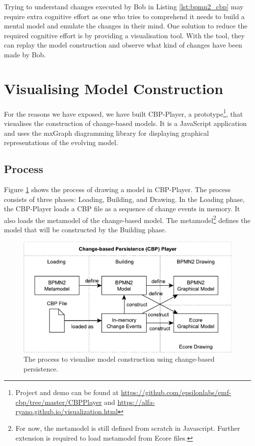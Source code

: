 \documentclass[conference]{IEEEtran}
\begin{document}
Trying to understand changes executed by Bob in Listing \ref{lst:bpmn2_cbp} may require extra cognitive effort 
as one who tries to comprehend it needs to build a mental model and emulate the changes in their mind.
One solution to reduce the required cognitive effort is by providing a visualisation tool.
With the tool, they can replay the model construction and observe what kind of changes have been made by Bob.

\section{Visualising Model Construction}
\label{sec:visualising_model_construction}
For the reasons we have exposed, we have built CBP-Player, a prototype\footnote{Project and demo can be found at \url{https://github.com/epsilonlabs/emf-cbp/tree/master/CBPPlayer} 
    and \url{https://alfa-ryano.github.io/visualization.html}},
that visualises the construction of change-based models.
It is a JavaScript application and uses the mxGraph diagramming library
 \cite{mxgraph2019mxgraph} for displaying graphical representations of the evolving model. 

\subsection{Process}
\label{sec:process}
Figure \ref{fig:process} shows the process of drawing a model in CBP-Player. 
The process consists of three phases: Loading, Building, and Drawing.  
In the Loading phase, the CBP-Player loads a CBP file as a sequence of change events in memory. 
It also loads the metamodel of the change-based model. 
The metamodel\footnote{For now, the metamodel is still defined from scratch in Javascript. Further extension is required to load metamodel from Ecore files.} 
defines the model that will be constructed by the Building phase.

\begin{figure}[h]
    \includegraphics[width=\linewidth]{process}
    \caption{The process to visualise model construction using change-based persistence.}
    \label{fig:process}
\end{figure}
\end{document}
